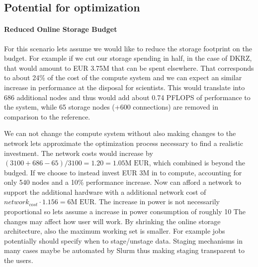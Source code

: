 \documentclass{../../template/esiwace-report}
\begin{document}
\subsection{Potential for optimization}

\paragraph{Reduced Online Storage Budget}
For this scenario lets assume we would like to reduce the storage footprint on the budget.
For example if we cut our storage spending in half, in the case of DKRZ, that would amount to EUR 3.75M that can be spent elsewhere.
That corresponds to about 24\% of the cost of the compute system and we can expect an similar increase in performance at the disposal for scientists.
This would translate into 686 additional nodes and thus would add about 0.74 PFLOPS of performance to the system, while 65 storage nodes (+600 connections) are removed in comparison to the reference.

We can not change the compute system without also making changes to the network lets approximate the optimization process necessary to find a realistic investment.
The network costs would increase by $(3100 + 686 - 65) / 3100 = 1.20 = 1.05 \mbox{M EUR}$, which combined is beyond the budged.
If we choose to instead invest EUR 3M in to compute, accounting for only  540 nodes and a 10\% performance increase.
Now can afford a network to support the additional hardware with a additional network cost of $ network_{cost} \cdot 1.156 = 6 \mbox{M EUR}$.
The increase in power is not necessarily proportional so lets assume a increase in power consumption of roughly 10%
The changes may affect how user will work.
By shrinking the online storage architecture, also the maximum working set is smaller.
For example jobs potentially should specify when to stage/unstage data.
Staging mechanisms in many cases maybe be automated by Slurm thus making staging transparent to the users.


%
%
%
%
%
%
\end{document}
